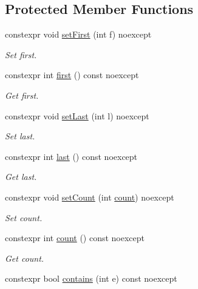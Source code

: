\subsection*{Protected Member Functions}
\begin{DoxyCompactItemize}
\item 
constexpr void \hyperlink{class_mdt_1_1_item_model_1_1_range_a107e3b7a224be9e55cd6a0f55100b503}{set\+First} (int f) noexcept\hypertarget{class_mdt_1_1_item_model_1_1_range_a107e3b7a224be9e55cd6a0f55100b503}{}\label{class_mdt_1_1_item_model_1_1_range_a107e3b7a224be9e55cd6a0f55100b503}

\begin{DoxyCompactList}\small\item\em Set first. \end{DoxyCompactList}\item 
constexpr int \hyperlink{class_mdt_1_1_item_model_1_1_range_a6aebf5560e9aa280bc7a996c1932c7ab}{first} () const noexcept
\begin{DoxyCompactList}\small\item\em Get first. \end{DoxyCompactList}\item 
constexpr void \hyperlink{class_mdt_1_1_item_model_1_1_range_a4c36bf69e59007793b7fc461eace54db}{set\+Last} (int l) noexcept\hypertarget{class_mdt_1_1_item_model_1_1_range_a4c36bf69e59007793b7fc461eace54db}{}\label{class_mdt_1_1_item_model_1_1_range_a4c36bf69e59007793b7fc461eace54db}

\begin{DoxyCompactList}\small\item\em Set last. \end{DoxyCompactList}\item 
constexpr int \hyperlink{class_mdt_1_1_item_model_1_1_range_a760800cf6cc90969db064ad2fa1060ce}{last} () const noexcept
\begin{DoxyCompactList}\small\item\em Get last. \end{DoxyCompactList}\item 
constexpr void \hyperlink{class_mdt_1_1_item_model_1_1_range_a29097f56fb561020ef4f70bfd2ed02ad}{set\+Count} (int \hyperlink{class_mdt_1_1_item_model_1_1_range_a5677e5e280f1153607c4d30d3816b5f2}{count}) noexcept
\begin{DoxyCompactList}\small\item\em Set count. \end{DoxyCompactList}\item 
constexpr int \hyperlink{class_mdt_1_1_item_model_1_1_range_a5677e5e280f1153607c4d30d3816b5f2}{count} () const noexcept
\begin{DoxyCompactList}\small\item\em Get count. \end{DoxyCompactList}\item 
constexpr bool \hyperlink{class_mdt_1_1_item_model_1_1_range_a0a70a22fcbfc8a6423fe6f508ad645ca}{contains} (int e) const noexcept\hypertarget{class_mdt_1_1_item_model_1_1_range_a0a70a22fcbfc8a6423fe6f508ad645ca}{}\label{class_mdt_1_1_item_model_1_1_range_a0a70a22fcbfc8a6423fe6f508ad645ca}


\end{DoxyCompactItemize}

